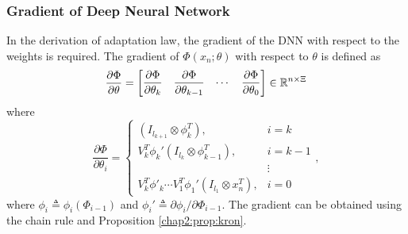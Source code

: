 \subsubsection{Gradient of Deep Neural Network} \label{chap2:sec:DNNgrad}

In the derivation of adaptation law, the gradient of the DNN with respect to the weights is required.
The gradient of $ \Phi(x_n;\theta)$ with respect to $\theta$ is defined as
\begin{equation}
    {\partial\Phi\over\partial \theta}=
    \begin{bmatrix}
        \dfrac{\partial \Phi}{\partial \theta_k}&
        \dfrac{\partial \Phi}{\partial \theta_{k-1}}&
    \cdots &
        \dfrac{\partial \Phi}{\partial \theta_0}
    \end{bmatrix}
    \in\mathbb{R}^{n \times \Xi}
    \label{chap2:eq:DNNgrad}
\end{equation}
where
\begin{equation}
    \frac{\partial \Phi}{\partial \theta_i} = 
    \begin{cases}
        (I_{l_{k+1}}\otimes \phi_{k}^T  ), & i=k \\
        V_k^T   \phi_{k}' (I_{l_{k}}\otimes  \phi_{k-1}^T  ), & i=k-1\\
        &\vdots \\
        V_k^T   \phi'_{k} \cdots V_1^T  \phi_1' (I_{l_1}\otimes x_n^T  ), & i = 0
    \end{cases},
\end{equation}
where $\phi_i\triangleq \phi_i(\Phi_{i-1})$ and $\phi_i'\triangleq \partial \phi_i/\partial \Phi_{i-1}$.
The gradient can be obtained using the chain rule and Proposition \ref{chap2:prop:kron}.
